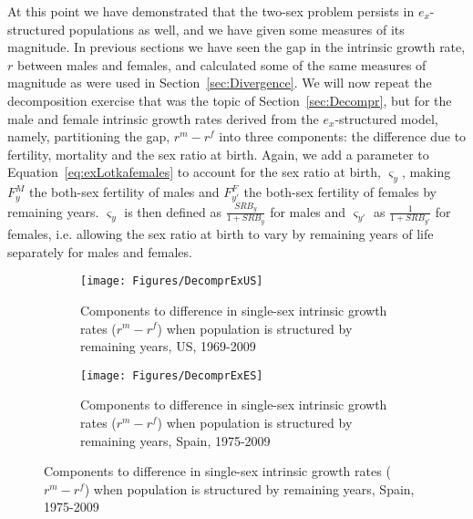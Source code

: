 At this point we have demonstrated that the two-sex problem persists in
$e_x$-structured populations as well, and we have given some measures of its
magnitude. In previous sections we have seen the gap in the intrinsic growth
rate, $r$ between males and females, and calculated some of the same 
measures of magnitude as were used in Section~\ref{sec:Divergence}. We
will now repeat the decomposition exercise that was the topic of 
Section~\ref{sec:Decompr}, but for the male and female intrinsic growth rates
derived from the $e_x$-structured model, namely, partitioning the gap, $r^m-r^f$
into three components: the difference due to fertility, mortality and the sex
ratio at birth. Again, we add a parameter to Equation~\eqref{eq:exLotkafemales}
to account for the sex ratio at birth, $\varsigma _{y}$, making $F_{y}^M$
the both-sex fertility of males and $F_{y'}^F$ the both-sex fertility of females
by remaining years. $\varsigma _{y}$ is then defined as $\frac{SRB_y}{1+SRB_y}$
for males and $\varsigma _{y'}$ as $\frac{1}{1+SRB_{y'}}$ for females, i.e.
allowing the sex ratio at birth to vary by remaining years of life separately for males and females.


\begin{figure}
        \centering
        \begin{subfigure}
                \centering
                \caption{Components to difference in single-sex intrinsic growth
                rates ($r^m - r^f$) when population is structured by remaining
                years, US, 1969-2009}
                \texttt{[image: Figures/DecomprExUS]}
                \label{fig:exDecomprUS}
        \end{subfigure}
        \begin{subfigure}
                \centering
                \caption{Components to difference in single-sex intrinsic growth
                rates ($r^m - r^f$) when population is structured by remaining
                years, Spain, 1975-2009}
                \texttt{[image: Figures/DecomprExES]}
               
                \label{fig:exDecomprES}
        \end{subfigure}
\end{figure}